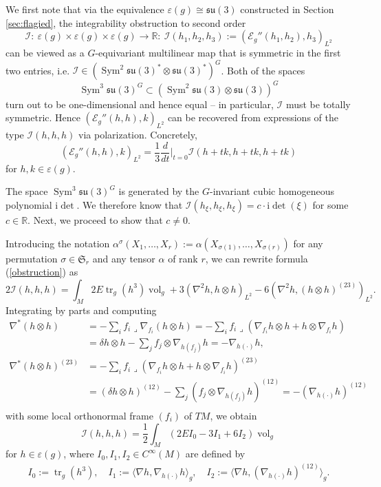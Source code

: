 \documentclass[12pt]{scrartcl}
\theoremstyle{plain}
\theoremstyle{definition}
\newcommand{\R}{\mathbb{R}}%
\newcommand{\vol}{\operatorname{vol}}%
\newcommand{\Sym}{\operatorname{Sym}}%
\newcommand{\tr}{\operatorname{tr}}%
\newcommand{\Sl}{\mathfrak{S}}%
\newcommand{\su}{\mathfrak{su}}%
\renewcommand{\i}{\mathrm{i}}%
\newcommand{\Einstein}{E}%
\newcommand{\Eop}{\mathcal{E}}%
\begin{document}
We first note that via the equivalence $\varepsilon(g)\cong\su(3)$ constructed in Section \ref{sec:flagied}, the integrability obstruction to second order
\[\mathcal{I}:\ \varepsilon(g)\times\varepsilon(g)\times\varepsilon(g)\to\R:\ \mathcal{I}(h_1,h_2,h_3):=\left(\Eop_g''(h_1,h_2),h_3\right)_{L^2}\]
can be viewed as a $G$-equivariant multilinear map that is symmetric in the first two entries, i.e. $\mathcal{I}\in(\Sym^2\su(3)^\ast\otimes\su(3)^\ast)^G$. Both of the spaces
\[\Sym^3\su(3)^G\subset(\Sym^2\su(3)\otimes\su(3))^G\]
turn out to be one-dimensional and hence equal -- in particular, $\mathcal{I}$ must be totally symmetric. Hence $\left(\Eop_g''(h,h),k\right)_{L^2}$ can be recovered from expressions of the type $\mathcal{I}(h,h,h)$ via polarization. Concretely,
\begin{equation}
\left(\Eop_g''(h,h),k\right)_{L^2}=\frac{1}{3}\frac{d}{dt}\big|_{t=0}\mathcal{I}(h+tk,h+tk,h+tk)\label{polarize}
\end{equation}
for $h,k\in\varepsilon(g)$.

The space $\Sym^3\su(3)^G$ is generated by the $G$-invariant cubic homogeneous polynomial $\i\det$. We therefore know that $\mathcal{I}(h_\xi,h_\xi,h_\xi)=c\cdot\i\det(\xi)$ for some $c\in\R$. Next, we proceed to show that $c\neq0$.

Introducing the notation $\alpha^\sigma(X_1,\ldots,X_r):=\alpha(X_{\sigma(1)},\ldots,X_{\sigma(r)})$ for any permutation $\sigma\in\Sl_r$ and any tensor $\alpha$ of rank $r$, we can rewrite formula (\ref{obstruction}) as
\[2\mathcal{I}(h,h,h)=\int_M2\Einstein\tr_g(h^3)\vol_g+3\left(\nabla^2h,h\otimes h\right)_{L^2}-6\left(\nabla^2h,(h\otimes h)^{(23)}\right)_{L^2}.\]
Integrating by parts and computing
\begin{align*}
\nabla^\ast(h\otimes h)&=-\sum_if_i\lrcorner\nabla_{f_i}(h\otimes h)=-\sum_if_i\lrcorner(\nabla_{f_i}h\otimes h+h\otimes\nabla_{f_i}h)\\
&=\delta h\otimes h-\sum_jf_j\otimes\nabla_{h(f_j)}h=-\nabla_{h(\cdot)}h,\\
\nabla^\ast(h\otimes h)^{(23)}&=-\sum_if_i\lrcorner(\nabla_{f_i}h\otimes h+h\otimes\nabla_{f_i}h)^{(23)}\\
&=(\delta h\otimes h)^{(12)}-\sum_j(f_j\otimes\nabla_{h(f_j)}h)^{(12)}=-(\nabla_{h(\cdot)}h)^{(12)}\\
\end{align*}
with some local orthonormal frame $(f_i)$ of $TM$, we obtain
\[\mathcal{I}(h,h,h)=\frac{1}{2}\int_M(2\Einstein I_0-3I_1+6I_2)\vol_g\]
for $h\in\varepsilon(g)$, where $I_0,I_1,I_2\in C^\infty(M)$ are defined by
\begin{align*}
I_0:=\tr_g(h^3),\quad I_1:=\langle\nabla h,\nabla_{h(\cdot)}h\rangle_g,\quad I_2:=\langle\nabla h,(\nabla_{h(\cdot)}h)^{(12)}\rangle_g.
\end{align*}
\end{document}
